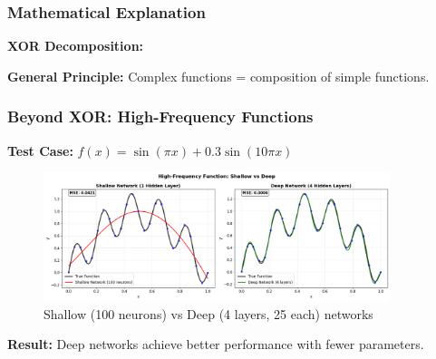 \documentclass[notes]{beamer}
\begin{document}
\begin{frame}
\frametitle{Mathematical Explanation}

\textbf{XOR Decomposition:}

\textbf{General Principle:} Complex functions = composition of simple functions.

\end{frame}

\begin{frame}
\frametitle{Beyond XOR: High-Frequency Functions}

\textbf{Test Case:} $f(x) = \sin(\pi x) + 0.3\sin(10\pi x)$

\begin{figure}[ht]
	\centering
	\includegraphics[width=0.9\textwidth]{figs/high-freq-comparison.png}
	\caption*{Shallow (100 neurons) vs Deep (4 layers, 25 each) networks}
\end{figure}

\textbf{Result:} Deep networks achieve better performance with fewer parameters.

\end{frame}
\end{document}
